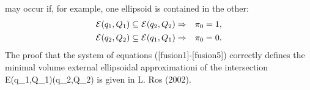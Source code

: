\documentclass[letterpaper,10pt,english]{sphinxmanual}
\begin{document}
may occur if, for example, one ellipsoid is contained in the other:
\begin{gather}
\begin{split}{\mathcal E}(q_1,Q_1)\subseteq{\mathcal E}(q_2,Q_2) & \Rightarrow & \pi_0 = 1,\\\end{split}\notag\\\begin{split}{\mathcal E}(q_2,Q_2)\subseteq{\mathcal E}(q_1,Q_1) & \Rightarrow & \pi_0 = 0.\\\end{split}\notag
\end{gather}
The proof that the system of equations ({[}fusion1{]}-{[}fusion5{]}) correctly
defines the minimal volume external ellipsoidal approximationi of the
intersection {\mathcal E}(q_1,Q_1)(q_2,Q_2) is
given in L. Ros (2002).
\end{document}
